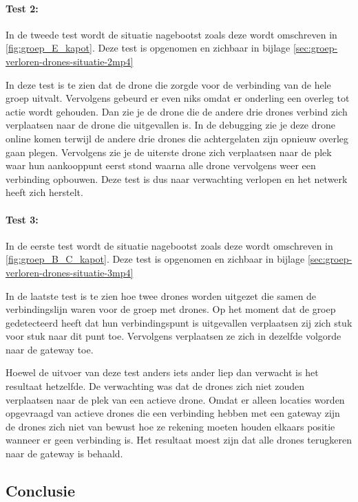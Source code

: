 \documentclass[a4paper, 11pt, oneside]{report}
\begin{document}
\paragraph{Test 2:} In de tweede test wordt de situatie nagebootst zoals deze wordt omschreven in \autoref{fig:groep_E_kapot}.
Deze test is opgenomen en zichbaar in bijlage \ref{sec:groep-verloren-drones-situatie-2mp4}

In deze test is te zien dat de drone die zorgde voor de verbinding van de hele groep uitvalt. Vervolgens gebeurd er even niks omdat er onderling een overleg tot actie wordt gehouden. Dan zie je de drone die de andere drie drones verbind zich verplaatsen naar de drone die uitgevallen is.
In de debugging zie je deze drone online komen terwijl de andere drie drones die achtergelaten zijn opnieuw overleg gaan plegen. 
Vervolgens zie je de uiterste drone zich verplaatsen naar de plek waar hun aankooppunt eerst stond waarna alle drone vervolgens weer een verbinding opbouwen. Deze test is dus naar verwachting verlopen en het netwerk heeft zich herstelt.

\paragraph{Test 3:} In de eerste test wordt de situatie nagebootst zoals deze wordt omschreven in \autoref{fig:groep_B_C_kapot}.
Deze test is opgenomen en zichbaar in bijlage \ref{sec:groep-verloren-drones-situatie-3mp4}

In de laatste test is te zien hoe twee drones worden uitgezet die samen de verbindingslijn waren voor de groep met drones.
Op het moment dat de groep gedetecteerd heeft dat hun verbindingspunt is uitgevallen verplaatsen zij zich stuk voor stuk naar dit punt toe.
Vervolgens verplaatsen ze zich in dezelfde volgorde naar de gateway toe.

Hoewel de uitvoer van deze test anders iets ander liep dan verwacht is het resultaat hetzelfde.
De verwachting was dat de drones zich niet zouden verplaatsen naar de plek van een actieve drone.
Omdat er alleen locaties worden opgevraagd van actieve drones die een verbinding hebben met een gateway zijn de drones zich niet van bewust hoe ze rekening moeten houden elkaars positie wanneer er geen verbinding is.
Het resultaat moest zijn dat alle drones terugkeren naar de gateway is behaald.

\subsection{Conclusie}
\end{document}
